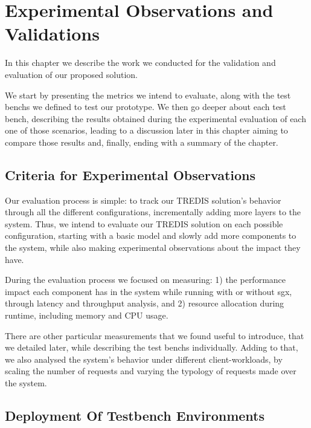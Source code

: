 \chapter{Experimental Observations and Validations}
\label{cha:experimentalEvaluation}

In this chapter we describe the work we conducted for the validation and evaluation of our proposed solution. 

We start by presenting the metrics we intend to evaluate, along with the test benchs we defined to test our prototype.
We then go deeper about each test bench, describing the results obtained during the experimental evaluation of each one of those scenarios, leading to a discussion later in this chapter aiming to compare those results and, finally, ending with a summary of the chapter.


\section{Criteria for Experimental Observations}
\label{sec:criteriaForExperimentalObservations}

Our evaluation process is simple: to track our TREDIS solution's behavior through all the different configurations, incrementally adding more layers to the system. Thus, we intend to evaluate our TREDIS solution on each possible configuration, starting with a basic model and slowly add more components to the system, while also making experimental observations about the impact they have. 

During the evaluation process we focused on measuring: 1) the performance impact each component has in the system while running with or without \gls{sgx}, through latency and throughput analysis, and 2) resource allocation during runtime, including memory and CPU usage. 

There are other particular measurements that we found useful to introduce, that we detailed later, while describing the test benchs individually.
Adding to that, we also analysed the system's behavior under different client-workloads, by scaling the number of requests and varying the typology of requests made over the system.


\section{Deployment Of Testbench Environments}
\label{sec:testBenchEnvironments}

